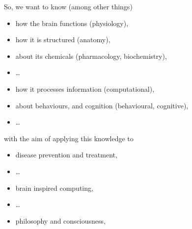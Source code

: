 \begin{frame}[c]{So, we want to know (among other things)}
  \begin{itemize}
    \item how the brain functions (\alert{physiology}),
    \item how it is structured (\alert{anatomy}),
    \item about its chemicals (\alert{pharmacology, biochemistry}),
    \item \ldots{}
      \pause{}
    \item how it processes information (\alert{computational}),
    \item about behaviours, and cognition (\alert{behavioural, cognitive}),
    \item \ldots{}
  \end{itemize}
\end{frame}
\begin{frame}[c]{with the aim of applying this knowledge to}
  \begin{itemize}
    \item \alert{disease} prevention and treatment,
    \item \ldots{}
      \pause{}
    \item brain inspired \alert{computing},
    \item \ldots{}
      \pause{}
    \item philosophy and consciousness,
  \end{itemize}
\end{frame}
